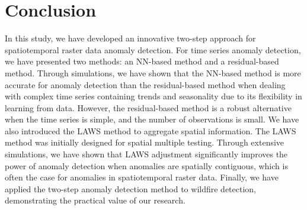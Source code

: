 \documentclass[11pt]{article}
\begin{document}
\section{Conclusion}
In this study, we have developed an innovative two-step approach for spatiotemporal raster data anomaly detection. For time series anomaly detection, we have presented two methods: an NN-based method and a residual-based method. Through simulations, we have shown that the NN-based method is more accurate for anomaly detection than the residual-based method when dealing with complex time series containing trends and seasonality due to its flexibility in learning from data. However, the residual-based method is a robust alternative when the time series is simple, and the number of observations is small. We have also introduced the LAWS method to aggregate spatial information. The LAWS method was initially designed for spatial multiple testing. Through extensive simulations, we have shown that LAWS adjustment significantly improves the power of anomaly detection when anomalies are spatially contiguous, which is often the case for anomalies in spatiotemporal raster data. Finally, we have applied the two-step anomaly detection method to wildfire detection, demonstrating the practical value of our research.






\clearpage
\end{document}
